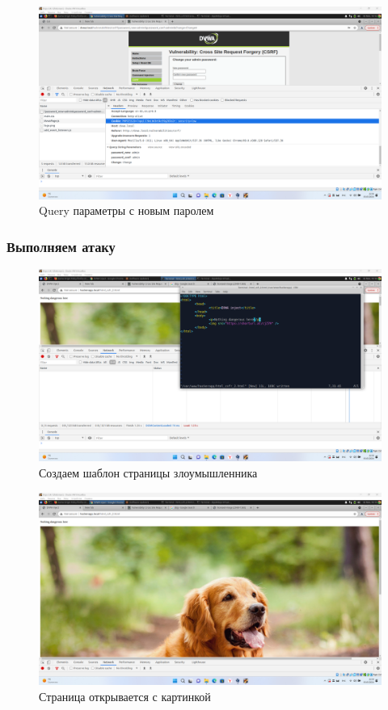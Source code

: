 \documentclass[a4paper]{article}
\begin{document}
  \begin{figure}[H]
    \centering
    \includegraphics[width=\textwidth]{Screenshot_93}
    \caption{Query параметры с новым паролем}
  \end{figure}

  \subsubsection{Выполняем атаку}

  \begin{figure}[H]
    \centering
    \includegraphics[width=\textwidth]{Screenshot_94}
    \caption{Создаем шаблон страницы злоумышленника}
  \end{figure}

  \begin{figure}[H]
    \centering
    \includegraphics[width=\textwidth]{Screenshot_95}
    \caption{Страница открывается с картинкой}
  \end{figure}
\end{document}
